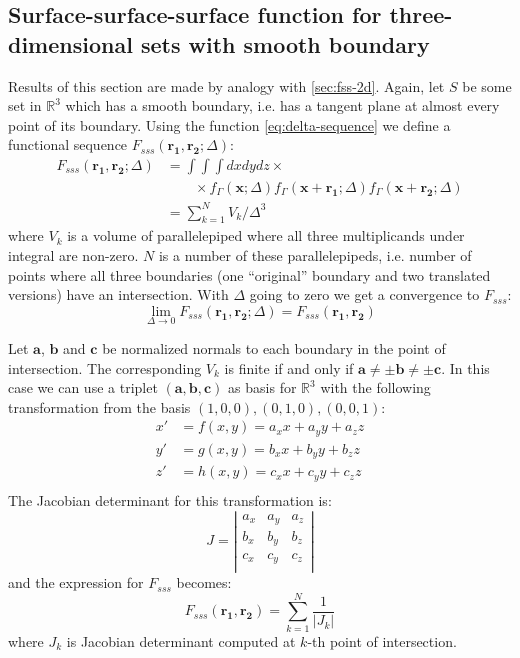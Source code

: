 \documentclass[reprint,amsmath,amssymb,aps,pre,showkeys,showpacs]{revtex4-1}
\begin{document}
\subsection{Surface-surface-surface function for three-dimensional sets with
  smooth boundary}
\label{sec:fsss-3d}
Results of this section are made by analogy with \cref{sec:fss-2d}. Again, let
$S$ be some set in $\mathbb{R}^3$ which has a smooth boundary, i.e. has a
tangent plane at almost every point of its boundary. Using the function
\cref{eq:delta-sequence} we define a functional sequence
$F_{sss}(\bm{r_1}, \bm{r_2}; \Delta)$:
\begin{align*}
  F_{sss}(\bm{r_1}, \bm{r_2}; \Delta) &= \int\int\int dx dy dz \times \\
  &\qquad \times f_\Gamma(\bm{x}; \Delta) f_\Gamma(\bm{x} + \bm{r_1}; \Delta)
  f_\Gamma(\bm{x} + \bm{r_2}; \Delta) \\
  &= \sum_{k=1}^N V_k/\Delta^3
\end{align*}
where $V_k$ is a volume of parallelepiped where all three multiplicands under
integral are non-zero. $N$ is a number of these parallelepipeds, i.e. number of
points where all three boundaries (one ``original'' boundary and two translated
versions) have an intersection. With $\Delta$ going to zero we get a convergence
to $F_{sss}$:
\begin{equation*}
  \lim_{\Delta \to 0} F_{sss}(\bm{r_1}, \bm{r_2}; \Delta) = F_{sss}(\bm{r_1},
  \bm{r_2})
\end{equation*}

Let $\bm{a}$, $\bm{b}$ and $\bm{c}$ be normalized normals to each boundary in
the point of intersection. The corresponding $V_k$ is finite if and only if
$\bm{a} \ne \pm \bm{b} \ne \pm \bm{c}$. In this case we can use a triplet
$(\bm{a}, \bm{b}, \bm{c})$ as basis for $\mathbb{R}^3$ with the following
transformation from the basis $(1,0,0), (0,1,0), (0, 0, 1)$:
\begin{align*}
  x' &= f(x, y) = a_x x + a_y y + a_z z \\
  y' &= g(x, y) = b_x x + b_y y + b_z z \\
  z' &= h(x, y) = c_x x + c_y y + c_z z \\
\end{align*}
The Jacobian determinant for this transformation is:
\begin{equation*}
  J = \left|
  \begin{array}{ccc}
    a_x & a_y & a_z \\
    b_x & b_y & b_z \\
    c_x & c_y & c_z \\
  \end{array}
  \right|
\end{equation*}
and the expression for $F_{sss}$ becomes:
\begin{equation}
  F_{sss}(\bm{r_1}, \bm{r_2}) = \sum_{k=1}^N \frac{1}{|J_k|} \label{eq:fsss-3d}
\end{equation}
where $J_k$ is Jacobian determinant computed at $k$-th point of
intersection.
\end{document}
